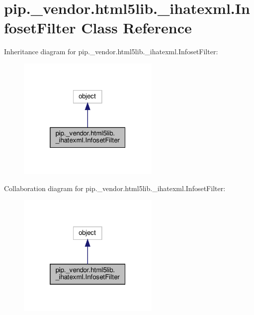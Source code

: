 \hypertarget{classpip_1_1__vendor_1_1html5lib_1_1__ihatexml_1_1InfosetFilter}{}\section{pip.\+\_\+vendor.\+html5lib.\+\_\+ihatexml.\+Infoset\+Filter Class Reference}
\label{classpip_1_1__vendor_1_1html5lib_1_1__ihatexml_1_1InfosetFilter}


Inheritance diagram for pip.\+\_\+vendor.\+html5lib.\+\_\+ihatexml.\+Infoset\+Filter\+:
\nopagebreak
\begin{figure}[H]
\begin{center}
\leavevmode
\includegraphics[width=193pt]{classpip_1_1__vendor_1_1html5lib_1_1__ihatexml_1_1InfosetFilter__inherit__graph}
\end{center}
\end{figure}


Collaboration diagram for pip.\+\_\+vendor.\+html5lib.\+\_\+ihatexml.\+Infoset\+Filter\+:
\nopagebreak
\begin{figure}[H]
\begin{center}
\leavevmode
\includegraphics[width=193pt]{classpip_1_1__vendor_1_1html5lib_1_1__ihatexml_1_1InfosetFilter__coll__graph}
\end{center}
\end{figure}
